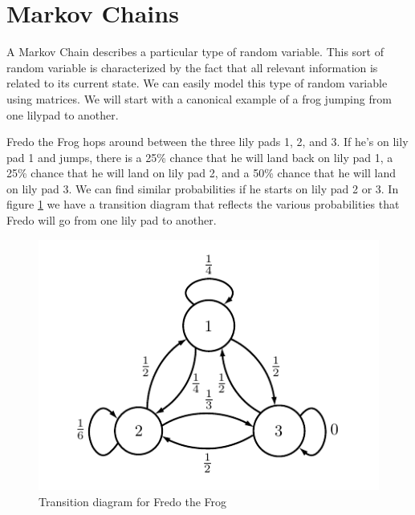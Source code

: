 \label{lab:MarkovGraph}


\section*{Markov Chains}


A Markov Chain describes a particular type of random variable.
This sort of random variable is characterized by the fact that all relevant information is related to its current state.
We can easily model this type of random variable using matrices.
We will start with a canonical example of a frog jumping from one lilypad to another.

Fredo the Frog hops around between the three lily pads 1, 2, and 3.
If he's on lily pad 1 and jumps, there is a 25\% chance that he will land back on lily pad 1, a 25\% chance that he will land on lily pad 2, and a 50\% chance that he will land on lily pad 3.
We can find similar probabilities if he starts on lily pad 2 or 3.
In figure \ref{markov1} we have a transition diagram that reflects the various probabilities that Fredo will go from one lily pad to another.

\begin{figure}[h!]
\begin{center}
\includegraphics[scale = 1.4]{markov1}
\end{center}
\caption{Transition diagram for Fredo the Frog}
\label{markov1}
\end{figure}

